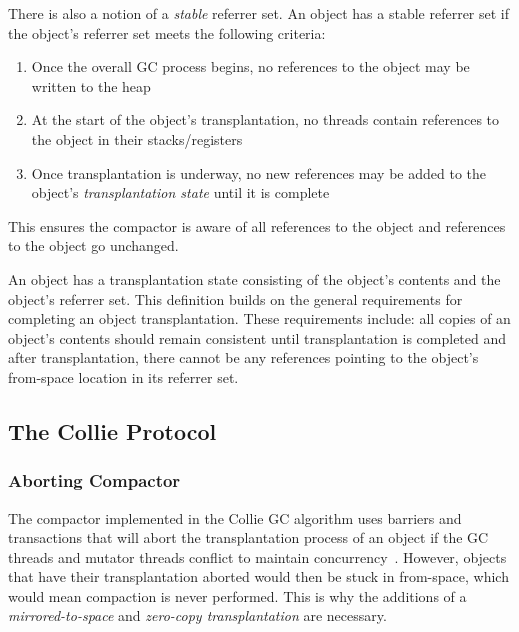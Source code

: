 \documentclass{sig-alternate}
\begin{document}
There is also a notion of a \emph{stable} referrer set. An object has a stable referrer 
set if the object's referrer set meets the following criteria:
\begin{enumerate}
\item Once the overall GC process begins, no references to the object may be written to the heap
\item At the start of the object's transplantation, no threads contain references to the object in their stacks/registers
\item Once transplantation is underway, no new references may be added to the object's \emph{transplantation state} until it is complete
\end{enumerate}
This ensures the compactor is aware of all references to the object
and references to the object go unchanged.

An object has a transplantation state consisting of the object's contents 
and the object's referrer set. This definition builds on the general requirements
for completing an object transplantation. These
requirements include: all copies of an object's contents should remain consistent
until transplantation is completed and after transplantation, there cannot be any
references pointing to the object's from-space location in its referrer set.



\subsection{The Collie Protocol}
\label{sec:collieAlgorithm}


\subsubsection{Aborting Compactor}
\label{sec:collieAbortion}

The compactor implemented in the Collie GC algorithm uses barriers 
and transactions that will abort the transplantation process of an object if the
GC threads and mutator threads conflict to maintain concurrency~\cite{Iyengar:Collie}.
However, objects that have their transplantation aborted would then be stuck
in from-space, which would mean compaction is never performed. This is why
the additions of a \emph{mirrored-to-space} and \emph{zero-copy transplantation} are necessary.
\end{document}
